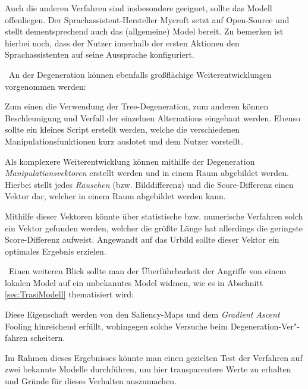 Auch die anderen Verfahren sind insbesondere geeignet, sollte das Modell offenliegen. Der Sprachassistent-Hersteller Mycroft setzt auf Open-Source und stellt dementsprechend auch das (allgemeine) Model bereit. 
Zu bemerken ist hierbei noch, dass der Nutzer innerhalb der ersten Aktionen den Sprachassistenten auf seine Aussprache konfiguriert.  

~\newline An der Degeneration können ebenfalls großflächige Weiterentwicklungen vorgenommen werden: 

Zum einen die Verwendung der Tree-Degeneration, zum anderen können Beschleunigung und Verfall der einzelnen Alternations eingebaut werden. Ebenso sollte ein kleines Script erstellt werden, welche die verschiedenen Manipulationsfunktionen kurz auslotet und dem Nutzer vorstellt. 

Als komplexere Weiterentwicklung können mithilfe der Degeneration \textit{Manipulationsvektoren} erstellt werden und in einem Raum abgebildet werden. Hierbei stellt jedes \textit{Rauschen} (bzw. Bilddifferenz) und die Score-Differenz einen Vektor dar, welcher in einem Raum abgebildet werden kann.   

Mithilfe dieser Vektoren könnte über statistische bzw. numerische Verfahren solch ein Vektor gefunden werden, welcher die größte Länge hat allerdings die geringste Score-Differenz aufweist. Angewandt auf das Urbild sollte dieser Vektor ein optimales Ergebnis erzielen.  

~\newline Einen weiteren Blick sollte man der Überführbarkeit der Angriffe von einem lokalen Model auf ein unbekanntes Model widmen, wie es in Abschnitt \ref{sec:TrasiModell} thematisiert wird: 

Diese Eigenschaft werden von den Saliency-Maps und dem \textit{Gradient Ascent} Fooling hinreichend erfüllt, wohingegen solche Versuche beim Degeneration-Ver"-fahren scheitern. 

Im Rahmen dieses Ergebnisses könnte man einen gezielten Test der Verfahren auf zwei bekannte Modelle durchführen, um hier transparentere Werte zu erhalten und Gründe für dieses Verhalten auszumachen. 
